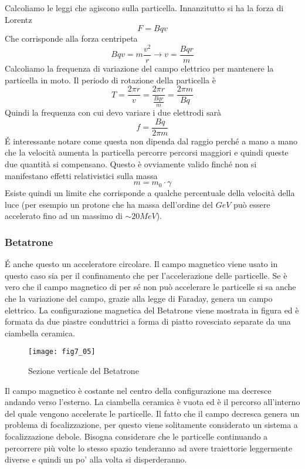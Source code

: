 Calcoliamo le leggi che agiscono sulla particella.
Innanzitutto si ha la forza di Lorentz
\begin{equation}
F=Bqv
\end{equation}
Che corrisponde alla forza centripeta
\begin{equation}
Bqv=m\frac{v^2}{r}\to v=\frac{Bqr}{m}
\end{equation}
Calcoliamo la frequenza di variazione del campo elettrico per mantenere la particella in moto.
Il periodo di rotazione della particella è
\begin{equation}
T=\frac{2\pi r}{v}=\frac{2\pi r}{\frac{Bqr}{m}}=\frac{2\pi m}{Bq}
\end{equation}
Quindi la frequenza con cui devo variare i due elettrodi sarà
\begin{equation}
f=\frac{Bq}{2\pi m}
\end{equation}
\'E interessante notare come questa non dipenda dal raggio perché a mano a mano che la velocità aumenta la particella percorre percorsi maggiori e quindi queste due quantità si compensano.
Questo è ovviamente valido finché non si manifestano effetti relativistici sulla massa
\begin{equation}
m=m_0\cdot \gamma
\end{equation}
Esiste quindi un limite che corrisponde a qualche percentuale della velocità della luce (per esempio un protone che ha massa dell'ordine del $GeV$ può essere accelerato fino ad un massimo di $\sim 20MeV$).

\subsubsection{Betatrone}
\'E anche questo un acceleratore circolare.
Il campo magnetico viene usato in questo caso sia per il confinamento che per l'accelerazione delle particelle.
Se è vero che il campo magnetico di per sé non può accelerare le particelle si sa anche che la variazione del campo, grazie alla legge di Faraday, genera un campo elettrico.
La configurazione magnetica del Betatrone viene mostrata in figura ed è formata da due piastre conduttrici a forma di piatto rovesciato separate da una ciambella ceramica.
\begin{figure}[h]
\centering
\texttt{[image: fig7\_05]}
\caption{Sezione verticale del Betatrone}
\end{figure}

Il campo magnetico è costante nel centro della configurazione ma decresce andando verso l'esterno.
La ciambella ceramica  è vuota ed è il percorso all'interno del quale vengono accelerate le particelle.
Il fatto che il campo decresca genera un problema di focalizzazione, per questo viene solitamente considerato un sistema a focalizzazione debole.
Bisogna considerare che le particelle continuando a percorrere più volte lo stesso spazio tenderanno ad avere traiettorie leggermente diverse e quindi un po' alla volta si disperderanno.

